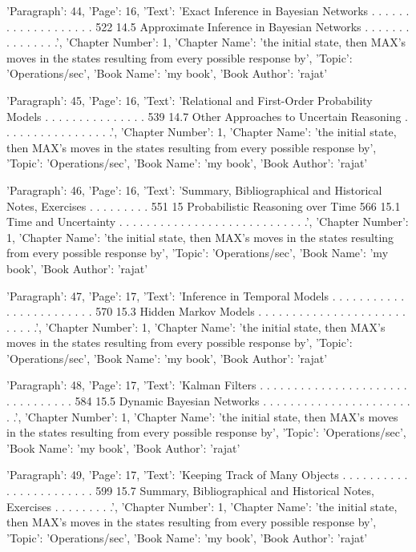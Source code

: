 {'Paragraph': 44, 'Page': 16, 'Text': 'Exact Inference in Bayesian Networks . . . . . . . . . . . . . . . . . . . 522 14.5 Approximate Inference in Bayesian Networks . . . . . . . . . . . . . . .', 'Chapter Number': 1, 'Chapter Name': 'the initial state, then MAX’s moves in the states resulting from every possible response by', 'Topic': 'Operations/sec', 'Book Name': 'my book', 'Book Author': 'rajat'}

{'Paragraph': 45, 'Page': 16, 'Text': 'Relational and First-Order Probability Models . . . . . . . . . . . . . . . 539 14.7 Other Approaches to Uncertain Reasoning . . . . . . . . . . . . . . . . .', 'Chapter Number': 1, 'Chapter Name': 'the initial state, then MAX’s moves in the states resulting from every possible response by', 'Topic': 'Operations/sec', 'Book Name': 'my book', 'Book Author': 'rajat'}

{'Paragraph': 46, 'Page': 16, 'Text': 'Summary, Bibliographical and Historical Notes, Exercises . . . . . . . . . 551 15 Probabilistic Reasoning over Time 566 15.1 Time and Uncertainty . . . . . . . . . . . . . . . . . . . . . . . . . . . .', 'Chapter Number': 1, 'Chapter Name': 'the initial state, then MAX’s moves in the states resulting from every possible response by', 'Topic': 'Operations/sec', 'Book Name': 'my book', 'Book Author': 'rajat'}

{'Paragraph': 47, 'Page': 17, 'Text': 'Inference in Temporal Models . . . . . . . . . . . . . . . . . . . . . . . . 570 15.3 Hidden Markov Models . . . . . . . . . . . . . . . . . . . . . . . . . . .', 'Chapter Number': 1, 'Chapter Name': 'the initial state, then MAX’s moves in the states resulting from every possible response by', 'Topic': 'Operations/sec', 'Book Name': 'my book', 'Book Author': 'rajat'}

{'Paragraph': 48, 'Page': 17, 'Text': 'Kalman Filters . . . . . . . . . . . . . . . . . . . . . . . . . . . . . . . . 584 15.5 Dynamic Bayesian Networks . . . . . . . . . . . . . . . . . . . . . . . .', 'Chapter Number': 1, 'Chapter Name': 'the initial state, then MAX’s moves in the states resulting from every possible response by', 'Topic': 'Operations/sec', 'Book Name': 'my book', 'Book Author': 'rajat'}

{'Paragraph': 49, 'Page': 17, 'Text': 'Keeping Track of Many Objects . . . . . . . . . . . . . . . . . . . . . . . 599 15.7 Summary, Bibliographical and Historical Notes, Exercises . . . . . . . . .', 'Chapter Number': 1, 'Chapter Name': 'the initial state, then MAX’s moves in the states resulting from every possible response by', 'Topic': 'Operations/sec', 'Book Name': 'my book', 'Book Author': 'rajat'}

